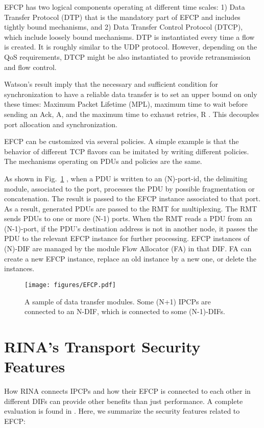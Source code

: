\documentclass{ieeeaccess}
\begin{document}
EFCP has two logical components operating at different time scales: 1) Data Transfer Protocol (DTP) that is the mandatory part of EFCP and includes tightly bound mechanisms, and 2) Data Transfer Control Protocol (DTCP), which include loosely bound mechanisms. DTP is instantiated every time a flow is created. It is roughly similar to the UDP protocol. However, depending on the QoS requirements, DTCP might be also instantiated to provide retransmission and flow control.

Watson's result imply that the necessary and sufficient condition for synchronization to have a reliable data transfer is to set an upper bound on only these times: Maximum Packet Lifetime (MPL), maximum time to wait before sending an Ack, A, and the maximum time to exhaust retries, R \cite{watson1981timer}. This decouples port allocation and synchronization.

EFCP can be customized via several policies. A simple example is that the behavior of different TCP flavors can be imitated by writing different policies. The mechanisms operating on PDUs and policies are the same.

As shown in Fig.~\ref{fig:rina-efcp} , when a PDU is written to an (N)-port-id, the delimiting module, associated to the port, processes the PDU by possible fragmentation or concatenation. The result is passed to the EFCP instance associated to that port. As a result, generated PDUs are passed to the RMT for multiplexing. The RMT sends PDUs to one or more (N-1) ports. When the RMT reads a PDU from an (N-1)-port, if the PDU's destination address is not in another node, it passes the PDU to the relevant EFCP instance for further processing. EFCP instances of (N)-DIF are managed by the module Flow Allocator (FA) in that DIF. FA can create a new EFCP instance, replace an old instance by a new one, or delete the instances.

\begin{figure}
	\centering
	\texttt{[image: figures/EFCP.pdf]}
	\caption{A sample of data transfer modules. Some (N+1) IPCPs are connected to an N-DIF, which is connected to some (N-1)-DIFs.}
	\label{fig:rina-efcp}
\end{figure}


\section{RINA's Transport Security Features} \label{sec:rina-trans}
How RINA connects IPCPs and how their EFCP is connected to each other in different DIFs can provide other benefits than just performance. A complete evaluation is found in \cite{ramezanifarkhani2018securing,small2012}. Here, we summarize the security features related to EFCP:
\end{document}
